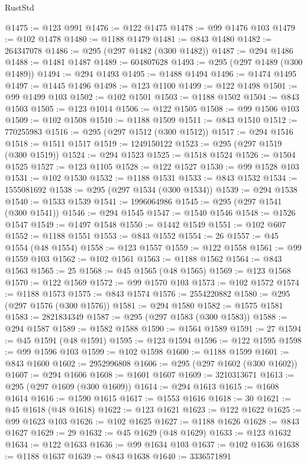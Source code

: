 \begin{lexlean}{RustStd}
\begin{coremodule}
@1475 := @123 @991
@1476 := @122 @1475
@1478 := @99 @1476 @103
@1479 := @102 @1478
@1480 := @1188 @1479
@1481 := @843 @1480
@1482 := 264347078
@1486 := @295 (@297 @1482 (@300 @1482))
@1487 := @294 @1486
@1488 := @1481 @1487
@1489 := 604807628
@1493 := @295 (@297 @1489 (@300 @1489))
@1494 := @294 @1493
@1495 := @1488 @1494
@1496 := @1474 @1495
@1497 := @1445 @1496
@1498 := @123 @1100
@1499 := @122 @1498
@1501 := @99 @1499 @103
@1502 := @102 @1501
@1503 := @1188 @1502
@1504 := @843 @1503
@1505 := @123 @1014
@1506 := @122 @1505
@1508 := @99 @1506 @103
@1509 := @102 @1508
@1510 := @1188 @1509
@1511 := @843 @1510
@1512 := 770255983
@1516 := @295 (@297 @1512 (@300 @1512))
@1517 := @294 @1516
@1518 := @1511 @1517
@1519 := 1249150122
@1523 := @295 (@297 @1519 (@300 @1519))
@1524 := @294 @1523
@1525 := @1518 @1524
@1526 := @1504 @1525
@1527 := @123 @1105
@1528 := @122 @1527
@1530 := @99 @1528 @103
@1531 := @102 @1530
@1532 := @1188 @1531
@1533 := @843 @1532
@1534 := 1555081692
@1538 := @295 (@297 @1534 (@300 @1534))
@1539 := @294 @1538
@1540 := @1533 @1539
@1541 := 1996064986
@1545 := @295 (@297 @1541 (@300 @1541))
@1546 := @294 @1545
@1547 := @1540 @1546
@1548 := @1526 @1547
@1549 := @1497 @1548
@1550 := @1442 @1549
@1551 := @102 @607
@1552 := @1188 @1551
@1553 := @843 @1552
@1554 := 26
@1557 := @45 @1554 (@48 @1554)
@1558 := @123 @1557
@1559 := @122 @1558
@1561 := @99 @1559 @103
@1562 := @102 @1561
@1563 := @1188 @1562
@1564 := @843 @1563
@1565 := 25
@1568 := @45 @1565 (@48 @1565)
@1569 := @123 @1568
@1570 := @122 @1569
@1572 := @99 @1570 @103
@1573 := @102 @1572
@1574 := @1188 @1573
@1575 := @843 @1574
@1576 := 2554220882
@1580 := @295 (@297 @1576 (@300 @1576))
@1581 := @294 @1580
@1582 := @1575 @1581
@1583 := 2821834349
@1587 := @295 (@297 @1583 (@300 @1583))
@1588 := @294 @1587
@1589 := @1582 @1588
@1590 := @1564 @1589
@1591 := 27
@1594 := @45 @1591 (@48 @1591)
@1595 := @123 @1594
@1596 := @122 @1595
@1598 := @99 @1596 @103
@1599 := @102 @1598
@1600 := @1188 @1599
@1601 := @843 @1600
@1602 := 2952996808
@1606 := @295 (@297 @1602 (@300 @1602))
@1607 := @294 @1606
@1608 := @1601 @1607
@1609 := 3210313671
@1613 := @295 (@297 @1609 (@300 @1609))
@1614 := @294 @1613
@1615 := @1608 @1614
@1616 := @1590 @1615
@1617 := @1553 @1616
@1618 := 30
@1621 := @45 @1618 (@48 @1618)
@1622 := @123 @1621
@1623 := @122 @1622
@1625 := @99 @1623 @103
@1626 := @102 @1625
@1627 := @1188 @1626
@1628 := @843 @1627
@1629 := 29
@1632 := @45 @1629 (@48 @1629)
@1633 := @123 @1632
@1634 := @122 @1633
@1636 := @99 @1634 @103
@1637 := @102 @1636
@1638 := @1188 @1637
@1639 := @843 @1638
@1640 := 3336571891

\end{coremodule}
\end{lexlean}

